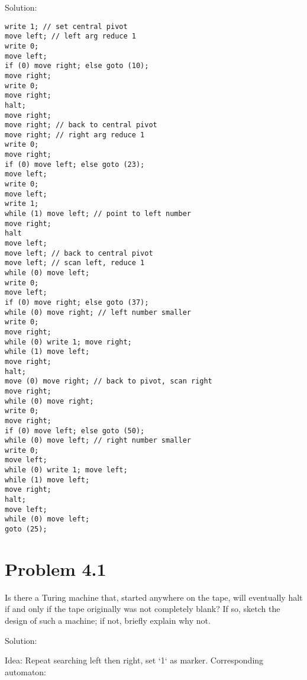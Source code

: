 \documentclass{ctexart}
\begin{document}
Solution:

\begin{lstlisting}[frame=single]
write 1; // set central pivot
move left; // left arg reduce 1
write 0;
move left;
if (0) move right; else goto (10);
move right;
write 0;
move right;
halt;
move right;
move right; // back to central pivot
move right; // right arg reduce 1
write 0;
move right;
if (0) move left; else goto (23);
move left;
write 0;
move left;
write 1;
while (1) move left; // point to left number
move right;
halt
move left;
move left; // back to central pivot
move left; // scan left, reduce 1
while (0) move left;
write 0;
move left;
if (0) move right; else goto (37);
while (0) move right; // left number smaller
write 0;
move right;
while (0) write 1; move right;
while (1) move left;
move right;
halt;
move (0) move right; // back to pivot, scan right
move right;
while (0) move right;
write 0;
move right;
if (0) move left; else goto (50);
while (0) move left; // right number smaller
write 0;
move left;
while (0) write 1; move left;
while (1) move left;
move right;
halt;
move left;
while (0) move left;
goto (25);
\end{lstlisting}

\section*{Problem 4.1}
Is there a Turing machine that, started anywhere on the tape, will eventually halt if and only if the tape originally was not completely blank? If so, sketch the design of such a machine; if not, briefly explain why not.

Solution:

Idea: Repeat searching left then right, set `1` as marker. Corresponding automaton:

\end{document}
